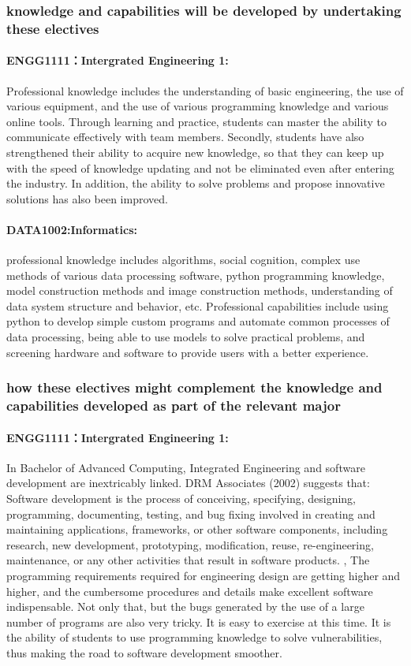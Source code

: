 \documentclass[../draft.tex]{subfiles}
\begin{document}
\subsubsection{knowledge and capabilities will be developed by undertaking these electives} 
\paragraph{ENGG1111：Intergrated Engineering 1:} 
Professional knowledge includes the understanding of basic engineering, the use of various equipment, and the use of various programming knowledge and various online tools. Through learning and practice, students can master the ability to communicate effectively with team members. Secondly, students have also strengthened their ability to acquire new knowledge, so that they can keep up with the speed of knowledge updating and not be eliminated even after entering the industry. In addition, the ability to solve problems and propose innovative solutions has also been improved.
\paragraph{DATA1002:Informatics:}
professional knowledge includes algorithms, social cognition, complex use methods of various data processing software, python programming knowledge, model construction methods and image construction methods, understanding of data system structure and behavior, etc. Professional capabilities include using python to develop simple custom programs and automate common processes of data processing, being able to use models to solve practical problems, and screening hardware and software to provide users with a better experience.
\subsubsection{how these electives might complement the knowledge and capabilities developed as part of the relevant major}
\paragraph{ENGG1111：Intergrated Engineering 1:} 
In Bachelor of Advanced Computing, Integrated Engineering and software development are inextricably linked. DRM Associates (2002) suggests that: Software development is the process of conceiving, specifying, designing, programming, documenting, testing, and bug fixing involved in creating and maintaining applications, frameworks, or other software components, including research, new development, prototyping, modification, reuse, re-engineering, maintenance, or any other activities that result in software products. , The programming requirements required for engineering design are getting higher and higher, and the cumbersome procedures and details make excellent software indispensable. Not only that, but the bugs generated by the use of a large number of programs are also very tricky. It is easy to exercise at this time. It is the ability of students to use programming knowledge to solve vulnerabilities, thus making the road to software development smoother.
\end{document}
